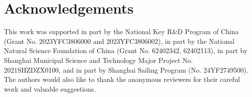 \section{Acknowledgements}

This work was supported in part by the National Key R\&D Program of China (Grant No. 2023YFC3806000 and 2023YFC3806002), in part by the National Natural Science Foundation of China (Grant No. 62402342, 62402113),
in part by Shanghai Municipal Science and Technology Major Project No. 2021SHZDZX0100, and in part by Shanghai Sailing Program (No. 24YF2749500). The authors would also like to thank the anonymous reviewers for their careful work and valuable suggestions. 

